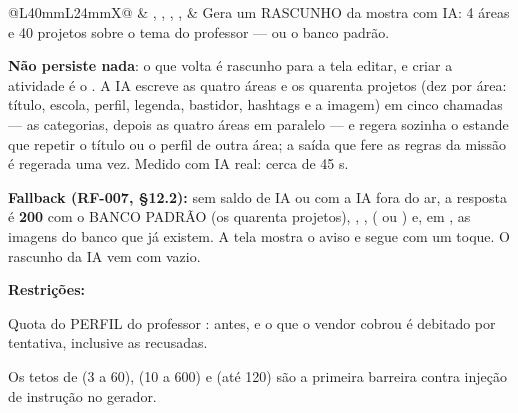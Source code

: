 \begin{tabularx}{\linewidth}{@{}L{40mm}L{24mm}X@{}}
 & , , , ,  & Gera um RASCUNHO da mostra com IA: 4 áreas e 40 projetos sobre o tema do professor --- ou o banco padrão.\par \textbf{Não persiste nada}: o que volta é rascunho para a tela editar, e criar a atividade é o . A IA escreve as quatro áreas e os quarenta projetos (dez por área: título, escola, perfil, legenda, bastidor, hashtags e a imagem) em cinco chamadas --- as categorias, depois as quatro áreas em paralelo --- e regera sozinha o estande que repetir o título ou o perfil de outra área; a saída que fere as regras da missão é regerada uma vez. Medido com IA real: cerca de 45 s.\par \textbf{Fallback (RF-007, \S{}12.2):} sem saldo de IA ou com a IA fora do ar, a resposta é \textbf{200} com o BANCO PADRÃO (os quarenta projetos), , ,  ( ou ) e, em , as imagens do banco que já existem. A tela mostra o aviso e segue com um toque. O rascunho da IA vem com  vazio.\par \textbf{Restrições:}\par \hspace*{1em}\textbullet{} Quota do PERFIL do professor :  antes, e o que o vendor cobrou é debitado por tentativa, inclusive as recusadas.\par \hspace*{1em}\textbullet{} Os tetos de  (3 a 60),  (10 a 600) e  (até 120) são a primeira barreira contra injeção de instrução no gerador.\\

\end{tabularx}
